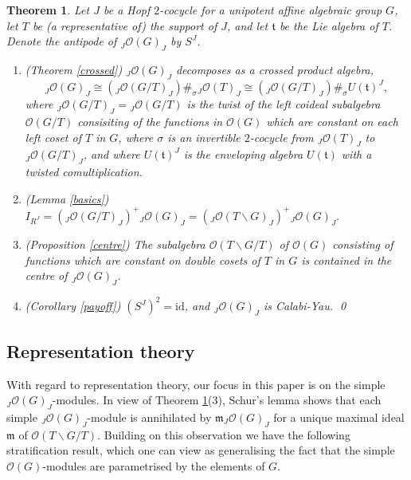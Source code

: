 \documentclass{amsart}
\numberwithin{equation}{section}
\newtheorem{theorem}{Theorem}[section]
\theoremstyle{definition}
\begin{document}
\begin{theorem}\label{structurethm} 
Let $J$ be a Hopf $2$-cocycle for a unipotent affine algebraic group $G$, let $T$ be (a representative of) the support of $J$, and let $\mathfrak{t}$ be the Lie algebra of $T$. Denote the antipode of ${}_J\mathcal{O}(G)_J$ by $S^J$.
\begin{enumerate}
\item {\rm (Theorem \ref{crossed})} ${}_J\mathcal{O}(G)_J$ decomposes as a crossed product algebra,
$$ {}_J\mathcal{O}(G)_J \cong ({}_J\mathcal{O}(G/T)_J)\#_{\sigma}{}_J\mathcal{O}(T)_J \cong ({}_J\mathcal{O}(G/T)_J)\#_{\sigma} U(\mathfrak{t})^J,$$
where ${}_J\mathcal{O}(G/T)_J={}_J\mathcal{O}(G/T)$ is the twist of the left coideal subalgebra $\mathcal{O}(G/T)$ consisiting of the functions in $\mathcal{O}(G)$ which are constant on each left coset of $T$ in $G$, where $\sigma$ is an invertible $2$-cocycle from ${}_J\mathcal{O}(T)_J$ to ${}_J\mathcal{O}(G/T)_J$, and where $U(\mathfrak{t})^J$ is the enveloping algebra $U(\mathfrak{t})$ with a twisted comultiplication.
\item {\rm (Lemma \ref{basics})} $ I_{R^J}=({}_J\mathcal{O}(G/T)_J)^{+}{}_J\mathcal{O}(G)_J= ({}_J\mathcal{O}(T\backslash G)_J)^{+}{}_J\mathcal{O}(G)_J.$
\item {\rm (Proposition \ref{centre})} The subalgebra $\mathcal{O}(T\backslash G / T)$ of $\mathcal{O}(G)$  consisting of functions which are constant on double cosets of $T$ in $G$ is contained in the centre of ${}_J\mathcal{O}(G)_J$. 
\item {\rm (Corollary \ref{payoff})} $(S^J)^2 = \mathrm{id}$, and ${}_J\mathcal{O}(G)_J$ is Calabi-Yau. \qed
\end{enumerate} 
\end{theorem}

\subsection{Representation theory}\label{reptheory} 
With regard to representation theory, our focus in this paper is on the simple ${}_J\mathcal{O}(G)_J$-modules. In view of  Theorem \ref{structurethm}(3), Schur's lemma shows that each simple ${}_J\mathcal{O}(G)_J$-module is annihilated by $\mathfrak{m}{}_J\mathcal{O}(G)_J$ for a unique maximal ideal $\mathfrak{m}$ of $\mathcal{O}(T\backslash G / T)$. Building on this observation we have the following stratification result, which one can view as generalising the fact that the simple $\mathcal{O}(G)$-modules are parametrised by the elements of $G$.
\end{document}
